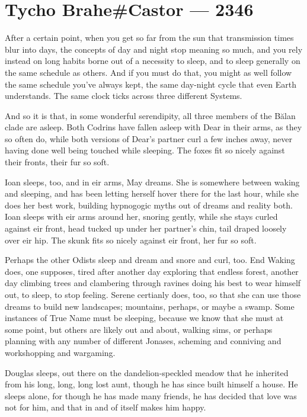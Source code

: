 \hypertarget{tycho-brahecastor-2346}{%
\chapter{Tycho Brahe\#Castor — 2346}\label{tycho-brahecastor-2346}}

After a certain point, when you get so far from the sun that transmission times blur into days, the concepts of day and night stop meaning so much, and you rely instead on long habits borne out of a necessity to sleep, and to sleep generally on the same schedule as others. And if you must do that, you might as well follow the same schedule you've always kept, the same day-night cycle that even Earth understands. The same clock ticks across three different Systems.

And so it is that, in some wonderful serendipity, all three members of the Bălan clade are asleep. Both Codrins have fallen asleep with Dear in their arms, as they so often do, while both versions of Dear's partner curl a few inches away, never having done well being touched while sleeping. The foxes fit so nicely against their fronts, their fur so soft.

Ioan sleeps, too, and in eir arms, May dreams. She is somewhere between waking and sleeping, and has been letting herself hover there for the last hour, while she does her best work, building hypnogogic myths out of dreams and reality both. Ioan sleeps with eir arms around her, snoring gently, while she stays curled against eir front, head tucked up under her partner's chin, tail draped loosely over eir hip. The skunk fits so nicely against eir front, her fur so soft.

Perhaps the other Odists sleep and dream and snore and curl, too. End Waking does, one supposes, tired after another day exploring that endless forest, another day climbing trees and clambering through ravines doing his best to wear himself out, to sleep, to stop feeling. Serene certianly does, too, so that she can use those dreams to build new landscapes; mountains, perhaps, or maybe a swamp. Some instances of True Name must be sleeping, because we know that she must at some point, but others are likely out and about, walking sims, or perhaps planning with any number of different Jonases, scheming and conniving and workshopping and wargaming.

Douglas sleeps, out there on the dandelion-speckled meadow that he inherited from his long, long, long lost aunt, though he has since built himself a house. He sleeps alone, for though he has made many friends, he has decided that love was not for him, and that in and of itself makes him happy.

